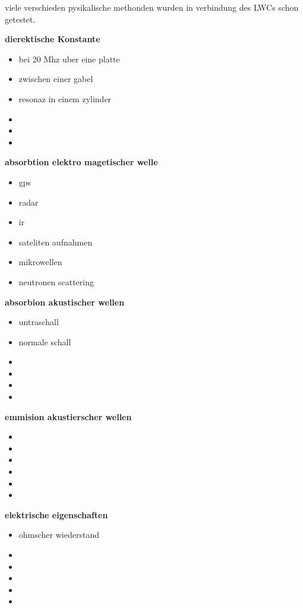 viele verschieden pysikalische methonden wurden in verbindung des LWCs schon getestet.

\textbf{dierektische Konstante}
\begin{itemize}
\item bei 20 Mhz uber eine platte
\item zwischen einer gabel
\item resonaz in einem zylinder
\item 
\item
\item
\end{itemize}

\textbf{absorbtion elektro magetischer welle}
\begin{itemize}
\item gps
\item radar
\item ir
\item sateliten aufnahmen
\item mikrowellen
\item neutronen scattering
\end{itemize}


\textbf{absorbion akustischer wellen}
\begin{itemize}
\item untraschall
\item normale schall
\item
\item
\item
\item
\end{itemize}


\textbf{emmision akustierscher wellen}
\begin{itemize}
\item
\item
\item
\item
\item
\item
\end{itemize}


\textbf{elektrische eigenschaften}
\begin{itemize}
\item ohmscher wiederstand
\item
\item
\item
\item
\item
\end{itemize}


